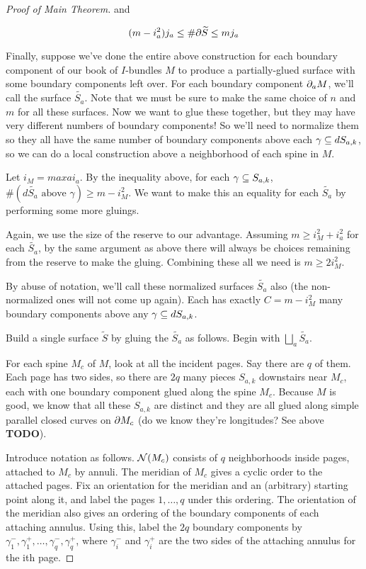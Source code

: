 \begin{proof}[Proof of Main Theorem]
and

\[ (m-i_a^2)j_a \leq \#\partial\widetilde{S} \leq mj_a \]

Finally, suppose we've done the entire above construction for each boundary
component of our book of $I$-bundles $M$ to produce a partially-glued surface
with some boundary components left over. For each boundary component $\partial_aM$,
we'll call the surface $\widetilde{S_a}$. Note that we must be sure to make the same
choice of $n$ and $m$ for all these surfaces. Now we want to glue these
together, but they may have very different numbers of boundary components! So
we'll need to normalize them so they all have the same number of boundary
components above each $\gamma \subseteq dS_{a,k}$, so we can do a local construction
above a neighborhood of each spine in $M$.

Let $i_M = max a i_a$. By the inequality above, for each $\gamma \subseteq S_{a,k}$,
$\#(d\widetilde{S_a} \text{ above } \gamma) \geq m - i_M^2$. We want to make
this an equality for each $\widetilde{S_a}$ by performing some more gluings.

Again, we use the size of the reserve to our advantage. Assuming $m\geq i_M^2
+ i_a^2$ for each $\widetilde{S_a}$, by the same argument as above there will
always be choices remaining from the reserve to make the gluing. Combining
these all we need is $m\geq 2i_M^2$.

By abuse of notation, we'll call these normalized surfaces $\widetilde{S_a}$ also (the
non-normalized ones will not come up again). Each has exactly $C = m - i_M^2$
many boundary components above any $\gamma \subseteq dS_{a,k}$.

Build a single surface $\widetilde{S}$ by gluing the $\widetilde{S_a}$ as follows. Begin with
$\bigsqcup_a \widetilde{S_a}$.

For each spine $M_c$ of $M$, look at all the incident pages. Say there are $q$
of them.  Each page has two sides, so there are $2q$ many pieces $S_{a,k}$
downstairs near $M_c$, each with one boundary component glued along the spine
$M_c$.  Because $M$ is good, we know that all these $S_{a,k}$ are distinct and
they are all glued along simple parallel closed curves on $\partial M_c$ (do we know
they're longitudes?  See above \textbf{ TODO}).

Introduce notation as follows. $\mathcal{N}(M_c)$ consists of $q$ neighborhoods inside
pages, attached to $M_c$ by annuli. The meridian of $M_c$ gives a cyclic order to
the attached pages.  Fix an orientation for the meridian and an (arbitrary)
starting point along it, and label the pages $1, \dots, q$ under this ordering.
The orientation of the meridian also gives an ordering of the boundary
components of each attaching annulus.  Using this, label the $2q$ boundary
components by $\gamma_1^-,\gamma_1^+,\dots, \gamma_q^-,\gamma_q^+$, where
$\gamma_i^-$ and $\gamma_i^+$ are the two sides of the attaching annulus for
the ith page.


\end{proof}
